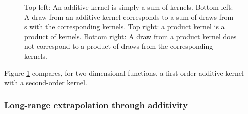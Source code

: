 \begin{figure}
\begin{tabular}{ccccc|c}
\end{tabular}
\caption[Additive kernels correspond to additive functions]{Top left: An additive kernel is simply a sum of kernels.  Bottom left:  A draw from an additive kernel corresponds to a sum of draws from \gp{}s with the corresponding kernels.  Top right: a product kernel is a product of kernels.  Bottom right:  A draw from a product kernel does not correspond to a product of draws from the corresponding kernels.
}
\label{fig:kernels}
\end{figure}

Figure \ref{fig:kernels} compares, for two-dimensional functions, a first-order additive kernel with a second-order kernel.



\subsubsection{Long-range extrapolation through additivity}

